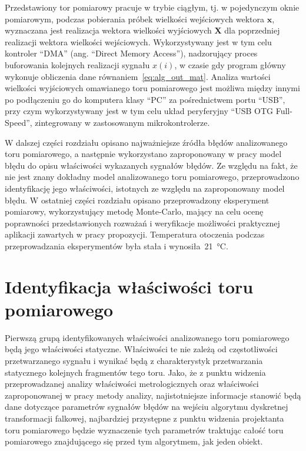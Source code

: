 Przedstawiony tor pomiarowy pracuje w trybie ciągłym, tj. w pojedynczym oknie pomiarowym, podczas pobierania próbek wielkości wejściowych wektora $\mathbf{x}$, wyznaczana jest realizacja wektora wielkości wyjściowych $\mathbf{X}$ dla poprzedniej realizacji wektora wielkości wejściowych. Wykorzystywany jest w tym celu kontroler \enquote{DMA} (ang. \enquote{Direct Memory Access}), nadzorujący proces buforowania kolejnych realizacji sygnału $x(i)$, w czasie gdy program główny wykonuje obliczenia dane równaniem~\eqref{eq:alg_out_mat}. Analiza wartości wielkości wyjściowych omawianego toru pomiarowego jest możliwa między innymi po podłączeniu go do komputera klasy \enquote{PC} za pośrednictwem portu \enquote{USB}, przy czym wykorzystywany jest w tym celu układ peryferyjny \enquote{USB OTG Full-Speed}, zintegrowany w zastosowanym mikrokontrolerze.

W dalszej części rozdziału opisano najważniejsze źródła błędów analizowanego toru pomiarowego, a następnie wykorzystano zaproponowany w pracy model błędu do opisu właściwości wykazanych sygnałów błędów. Ze względu na fakt, że nie jest znany dokładny model analizowanego toru pomiarowego, przeprowadzono identyfikację jego właściwości, istotnych ze względu na zaproponowany model błędu. W ostatniej części rozdziału opisano przeprowadzony eksperyment pomiarowy, wykorzystujący metodę Monte-Carlo, mający na celu ocenę poprawności przedstawionych rozważań i weryfikacje możliwości praktycznej aplikacji zawartych w pracy propozycji. Temperatura otoczenia podczas przeprowadzania eksperymentów była stała i wynosiła~\qty{21}{\degreeCelsius}.

\section{Identyfikacja właściwości toru pomiarowego}

Pierwszą grupą identyfikowanych właściwości analizowanego toru pomiarowego będą jego właściwości statyczne. Właściwości te nie zależą od częstotliwości przetwarzanego sygnału i wynikać będą z charakterystyk przetwarzania statycznego kolejnych fragmentów tego toru. Jako, że z punktu widzenia przeprowadzanej analizy właściwości metrologicznych oraz właściwości zaproponowanej w pracy metody analizy, najistotniejsze informacje stanowić będą dane dotyczące parametrów sygnałów błędów na wejściu algorytmu dyskretnej transformacji falkowej, najbardziej przystępne z punktu widzenia projektanta toru pomiarowego będzie wyznaczenie tych parametrów traktując całość toru pomiarowego znajdującego się przed tym algorytmem, jak jeden obiekt.

